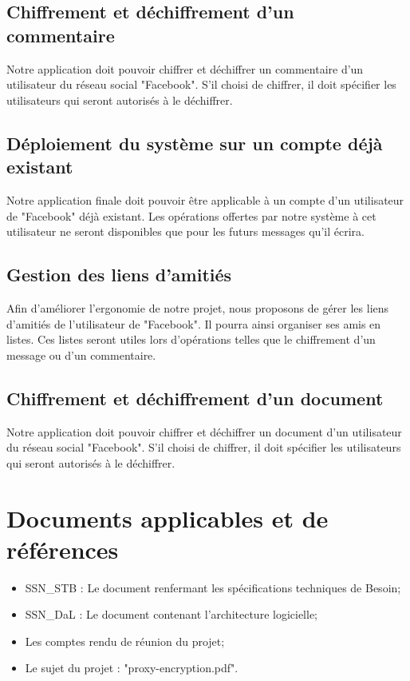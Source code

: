 \documentclass[a4paper,11pt,french]{article}
\begin{document}
\subsection*{Chiffrement et déchiffrement d'un commentaire}
Notre application doit pouvoir chiffrer et déchiffrer un commentaire d'un
utilisateur du réseau social "Facebook". S'il choisi de chiffrer, il doit
spécifier les utilisateurs qui seront autorisés à le déchiffrer.

\subsection*{Déploiement du système sur un compte déjà existant}
Notre application finale doit pouvoir être applicable à un compte d'un
utilisateur de "Facebook" déjà existant. Les opérations offertes par notre
système à cet utilisateur ne seront disponibles que pour les futurs messages
qu'il écrira.

\subsection*{Gestion des liens d'amitiés}
Afin d'améliorer l'ergonomie de notre projet, nous proposons de gérer les
liens d'amitiés de l'utilisateur de "Facebook". Il pourra ainsi organiser
ses amis en listes. Ces listes seront utiles lors d'opérations telles que
le chiffrement d'un message ou d'un commentaire.

\subsection*{Chiffrement et déchiffrement d'un document}
Notre application doit pouvoir chiffrer et déchiffrer un document d'un
utilisateur du réseau social "Facebook". S'il choisi de chiffrer, il
doit spécifier les utilisateurs qui seront autorisés à le déchiffrer.



\section{Documents applicables et de références}
\begin{itemize}
	\item SSN\_STB : Le document renfermant les spécifications techniques de Besoin;
	\item SSN\_DaL : Le document contenant l'architecture logicielle;
	\item Les comptes rendu de réunion du projet;
	\item Le sujet du projet : "proxy-encryption.pdf".
\end{itemize}
\end{document}
